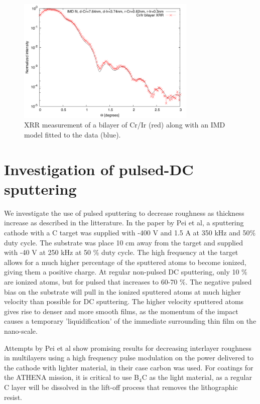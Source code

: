 \begin{figure}[!h]
	\center
	\includegraphics[height=6cm]{figures/athena/coatings/cr-ir-fit.pdf}
\caption{\footnotesize XRR measurement of a bilayer of Cr/Ir (red) along with an IMD model fitted to the data (blue).}\label{fig:cr-ir-fit}
\end{figure}

\section{Investigation of pulsed-DC sputtering}
We investigate the use of pulsed sputtering to decrease roughness as thickness increase as described in the litterature\cite{Pei:2009gn,Shaha:2011gy,Turkin:2010ur}. In the paper by Pei et al, a sputtering cathode with a C target was supplied with -400 V and 1.5 A at 350 kHz and 50\% duty cycle. The substrate was place 10 cm away from the target and supplied with -40 V at 250 kHz at 50 \% duty cycle. The high frequency at the target allows for a much higher percentage of the sputtered atoms to become ionized, giving them a positive charge. At regular non-pulsed DC sputtering, only 10 \% are ionized atoms, but for pulsed that increases to 60-70 \%\cite{Bradley:2002ge,Pei:2008jl}. The negative pulsed bias on the substrate will pull in the ionized sputtered atoms at much higher velocity than possible for DC sputtering. The higher velocity sputtered atoms gives rise to denser and more smooth films, as the momentum of the impact causes a temporary 'liquidification' of the immediate surrounding thin film on the nano-scale.

Attempts by Pei et al show promising results for decreasing interlayer roughness in multilayers using a high frequency pulse modulation on the power delivered to the cathode with lighter material, in their case carbon was used. For coatings for the ATHENA mission, it is critical to use B$_4$C as the light material, as a regular C layer will be dissolved in the lift-off process that removes the lithographic resist.

